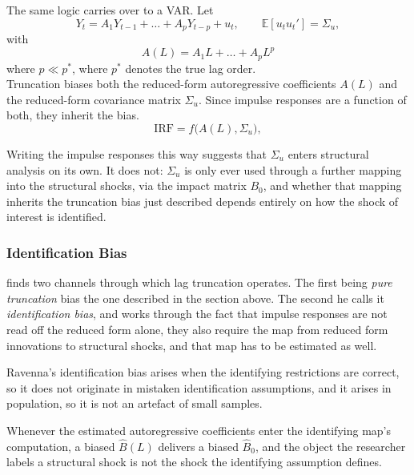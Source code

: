 \documentclass[12pt, a4paper]{article}
\begin{document}
The same logic carries over to a VAR. Let
\begin{equation}
    Y_t = A_1 Y_{t-1} + \dots + A_p Y_{t-p} + u_t,
    \qquad \mathbb{E}[u_t u_t'] = \Sigma_u ,
    \label{eq:var}
\end{equation}
with 
\begin{equation}
    A(L) = A_1 L + \dots + A_p L^p
\end{equation} 
where $p \ll p^{*}$, where $p^{*}$ denotes the true lag order.
\\

Truncation biases both the reduced-form autoregressive coefficients $A(L)$ and the reduced-form
covariance matrix $\Sigma_u$.
Since impulse responses are a function of both, they inherit the bias.
\begin{equation}
    \mathrm{IRF} = f\bigl(A(L), \Sigma_u\bigr),
    \label{eq:irf-f}
\end{equation}

Writing the impulse responses this way suggests that $\Sigma_u$ enters structural analysis on
its own. It does not: $\Sigma_u$ is only ever used through a further mapping into the
structural shocks, via the impact matrix $B_0$, and whether that mapping inherits the
truncation bias just described depends entirely on how the shock of interest is identified.

\subsubsection*{Identification Bias}
\label{sec:identification_bias}

\citet{Ravenna2007} finds two channels through which lag truncation operates. The first being \textit{pure
truncation} bias the one described in the section above.
The second he calls it \textit{identification bias}, and works through the fact that
impulse responses are not read off the reduced form alone, they also require the
map from reduced form innovations to structural shocks, and that map
has to be estimated as well.

Ravenna's identification bias arises when the identifying restrictions are correct, 
so it does not originate in mistaken identification assumptions, 
and it arises in population, so it is not an artefact of small samples.

Whenever the estimated autoregressive coefficients enter the identifying map's
computation, a biased $\hat{B}(L)$ delivers a biased $\hat{B}_0$, and the object the researcher
labels a structural shock is not the shock the identifying assumption defines.
\\
\end{document}
